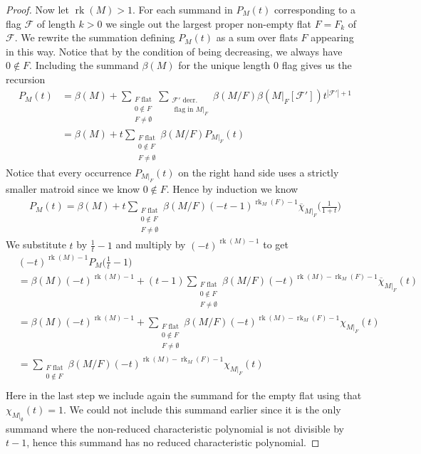 \documentclass[10pt,a4paper]{amsart}
\DeclareMathOperator{\rank}{rk}
\begin{document}
\begin{proof}
Now let $\rank(M)>1$.
For each summand in $P_M(t)$ corresponding to a flag $\mathcal{F}$ of length $k>0$ we single out the largest proper non-empty flat $F=F_k$ of $\mathcal{F}$. We rewrite the summation defining $P_M(t)$ as a sum over flats $F$ appearing in this way. Notice that by the condition of being decreasing, we always have $0\notin F$. Including the summand $\beta(M)$ for the unique length 0 flag gives us the recursion 
\begin{align*}
    P_M(t)&=\beta(M)+\sum_{\substack{F \text{ flat} \\ 0\notin F\\F\neq \emptyset}}\sum_{\substack{\mathcal{F}' \text{ decr.} \\ \text{ flag in }M|_F}}\beta(M/F)\beta(M|_F[\mathcal{F}'])t^{|\mathcal{F}'|+1} \\
    &=\beta(M)+t\sum_{\substack{F \text{ flat} \\ 0\notin F\\F\neq \emptyset}}\beta(M/F)P_{M|_F}(t)
\end{align*}
Notice that every occurrence $P_{M|_F}(t)$ on the right hand side uses a strictly smaller matroid since we know $0\notin F$. Hence by induction we know \begin{align*}
        P_M(t)=\beta(M)+t\sum_{\substack{F \text{ flat} \\ 0\notin F\\F\neq \emptyset}}\beta(M/F)(-t-1)^{\rank_M(F)-1}\overline{\chi}_{M|_F}\big(\frac{1}{1+t}\big)
\end{align*}
We substitute $t$ by $\frac{1}{t}-1$ and multiply by $(-t)^{\rank(M)-1}$ to get \begin{align*}
    &(-t)^{\rank(M)-1}P_M\big(\frac{1}{t}-1\big)\\&=\beta(M)(-t)^{\rank(M)-1}+(t-1)\sum_{\substack{F \text{ flat} \\ 0\notin F\\F\neq \emptyset}}\beta(M/F)(-t)^{\rank(M)-\rank_M(F)-1}\overline{\chi}_{M|_F}(t) \\
    &=\beta(M)(-t)^{\rank(M)-1}+\sum_{\substack{F \text{ flat} \\ 0\notin F\\F\neq \emptyset}}\beta(M/F)(-t)^{\rank(M)-\rank_M(F)-1}\chi_{M|_F}(t) \\
        &=\sum_{\substack{F \text{ flat} \\ 0\notin F}}\beta(M/F)(-t)^{\rank(M)-\rank_M(F)-1}\chi_{M|_F}(t) \\
\end{align*}
Here in the last step we include again the summand for the empty flat using that $\chi_{M|_\emptyset}(t)=1$. We could not include this summand earlier since it is the only summand where the non-reduced characteristic polynomial is not divisible by $t-1$, hence this summand has no reduced characteristic polynomial. 


\end{proof}
\end{document}
